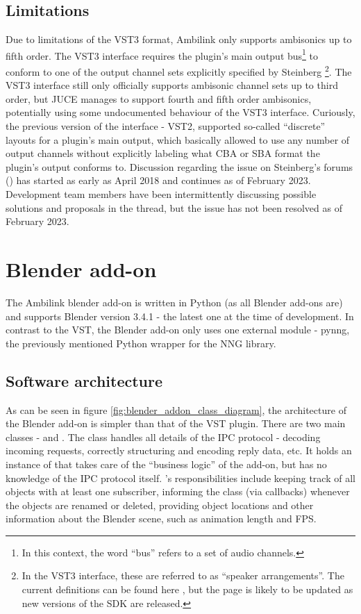 \subsection{Limitations} \label{subsection:vst_limitations}
Due to limitations of the VST3 format, Ambilink only supports ambisonics up to fifth order.
The VST3 interface requires the plugin's main output bus\footnote{In this context, the word ``bus'' refers to a set of audio channels.}
to conform to one of the output channel sets explicitly specified by Steinberg
\footnote{In the VST3 interface, these are referred to as ``speaker arrangements''. The current definitions can be found here \cite{vst3_doc_speaker_arrangement}, 
but the page is likely to be updated as new versions of the SDK are released.}. 
The VST3 interface still only officially supports ambisonic channel sets up to third order, but
JUCE manages to support fourth and fifth order ambisonics, potentially using some undocumented behaviour of the VST3 interface.
Curiously, the previous version of the interface - VST2, supported so-called ``discrete'' 
layouts for a plugin's main output, which basically allowed to use any number of output channels without explicitly 
labeling what CBA or SBA format the plugin's output conforms to. 
Discussion regarding the issue on Steinberg's forums (\cite{vst3_hoa_steinberg_forums}) has started as early as April 2018 and continues as of February 2023.
Development team members have been intermittently discussing possible solutions and proposals in the thread, 
but the issue has not been resolved as of February 2023.

\section{Blender add-on}
The Ambilink blender add-on is written in Python (as all Blender add-ons are) and supports Blender version 3.4.1 - the latest one at the time of development.
In contrast to the VST, the Blender add-on only uses one external module - pynng, the previously mentioned Python wrapper for the NNG library.

\subsection{Software architecture}

As can be seen in figure \ref{fig:blender_addon_class_diagram}, the architecture of the Blender add-on is simpler than that of the VST plugin. 
There are two main classes -  and .
The  class handles all details of the IPC protocol - decoding incoming requests, correctly structuring and encoding reply data, etc.
It holds an instance of  that takes care of the ``business logic'' of the add-on, but has no knowledge of the IPC protocol itself.
's responsibilities include keeping track of all objects with at least one subscriber,
informing the  class (via callbacks) whenever the objects are renamed or deleted, 
providing object locations and other information about the Blender scene, such as animation length and FPS.

